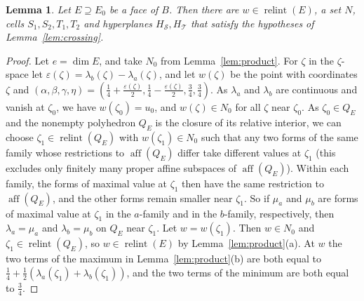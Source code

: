\documentclass[11pt]{article}
\newtheorem{lemma}[theorem]{Lemma}
\theoremstyle{definition}
\theoremstyle{remark}
\newcommand{\SSS}{\mathcal S}
\newcommand{\TT}{\mathcal T}
\newcommand{\relint}{\operatorname{relint}}
\newcommand{\aff}{\operatorname{aff}}
\begin{document}
\begin{lemma}\label{lem:coface-crossing}
Let $E\supseteq E_0$ be a face of $B$. Then there are $w\in\relint(E)$, a set $N$, cells $S_1,S_2,T_1,T_2$
and hyperplanes $H_\SSS,H_\TT$ that satisfy the hypotheses of Lemma~\ref{lem:crossing}.
\end{lemma}
\begin{proof}
Let $e=\dim E$, and take $N_0$ from Lemma~\ref{lem:product}. For $\zeta$ in the $\zeta$-space let
$\varepsilon(\zeta)=\lambda_b(\zeta)-\lambda_a(\zeta)$, and let $w(\zeta)$ be the point with coordinates $\zeta$
and $(\alpha,\beta,\gamma,\eta)=(\frac14+\frac{\varepsilon(\zeta)}2,\frac14-\frac{\varepsilon(\zeta)}2,\frac34,\frac34)$.
As $\lambda_a$ and $\lambda_b$ are continuous and vanish at $\zeta_0$, we have $w(\zeta_0)=u_0$, and $w(\zeta)\in N_0$
for all $\zeta$ near $\zeta_0$. As $\zeta_0\in Q_E$ and the nonempty polyhedron $Q_E$ is the closure of its relative interior, we can choose $\zeta_1\in\relint(Q_E)$ with $w(\zeta_1)\in N_0$ such that any two forms of the same family whose restrictions to $\aff(Q_E)$ differ take different values at $\zeta_1$ (this excludes only finitely many proper affine subspaces of $\aff(Q_E)$). Within each family, the forms of maximal value at $\zeta_1$ then have the same restriction to $\aff(Q_E)$, and the other forms remain smaller near $\zeta_1$. So if $\mu_a$ and $\mu_b$ are forms of maximal value at $\zeta_1$ in the $a$-family and in the $b$-family, respectively, then $\lambda_a=\mu_a$ and $\lambda_b=\mu_b$ on $Q_E$ near $\zeta_1$. Let $w=w(\zeta_1)$. Then $w\in N_0$ and $\zeta_1\in\relint(Q_E)$, so $w\in\relint(E)$ by Lemma~\ref{lem:product}(a). At $w$ the two terms of the maximum in Lemma~\ref{lem:product}(b) are both equal to $\frac14+\frac12(\lambda_a(\zeta_1)+\lambda_b(\zeta_1))$, and the two terms of the minimum are both equal to $\frac34$.


\end{proof}
\end{document}
